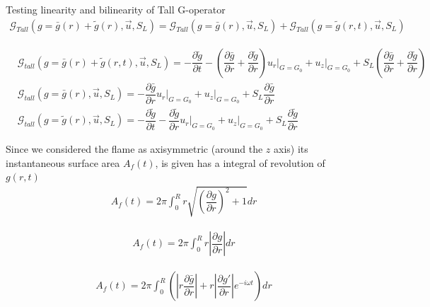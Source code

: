 Testing linearity and bilinearity of Tall G-operator 
\begin{align*}
	\mathcal{G}_{Tall}(g=\bar{g}(r)+\tilde{g}(r),\vec{u},S_L)=\mathcal{G}_{Tall}(g=\bar{g}(r),\vec{u},S_L)+ 	\mathcal{G}_{Tall}(g=\tilde{g}(r,t),\vec{u},S_L)
\end{align*}

\begin{align*}
&\mathcal{G}_{tall}(g=\bar{g}(r)+\tilde{g}(r,t),\vec{u},S_L)=-\dfrac{\partial \tilde{g}}{\partial t} - \left(\dfrac{\partial \bar{g}}{\partial r}+ \dfrac{\partial \tilde{g}}{\partial r} \right)\left.u_r\right|_{G=G_0}+\left.u_z\right|_{G=G_0} + S_L \left(\dfrac{\partial \bar{g}}{\partial r}+ \dfrac{\partial \tilde{g}}{\partial r} \right)\\
&\mathcal{G}_{tall}(g=\bar{g}(r),\vec{u},S_L)=- \dfrac{\partial \bar{g}}{\partial r} \left.u_r\right|_{G=G_0}+\left.u_z\right|_{G=G_0} + S_L \dfrac{\partial \bar{g}}{\partial r}\\
&\mathcal{G}_{tall}(g=\tilde{g}(r),\vec{u},S_L)=- \dfrac{\partial \tilde{g}}{\partial t}-\dfrac{\partial \tilde{g}}{\partial r} \left.u_r\right|_{G=G_0}+\left.u_z\right|_{G=G_0} + S_L \dfrac{\partial \tilde{g}}{\partial r}
\end{align*}



























\clearpage

Since we considered the flame as axisymmetric (around the $z$ axis) its instantaneous surface area $A_f(t)$, is given has a integral of revolution of $g(r,t)$
\begin{align}
A_f(t)=2 \pi \int_0^R r\sqrt{\left(\dfrac{\partial g}{\partial r}\right)^2+1} dr
\end{align}

\begin{align*}
A_f(t)=2\pi \int_0^R r \left|\dfrac{\partial g}{\partial r}\right|  dr 
\end{align*}		

\begin{align}
A_f(t)=2\pi \int_0^R \left( \left| r \dfrac{\partial \bar{g}}{\partial r}\right| + r \left| \dfrac{\partial g'}{\partial r} \right|  e^{-i\omega t} \right) dr 
\end{align}

